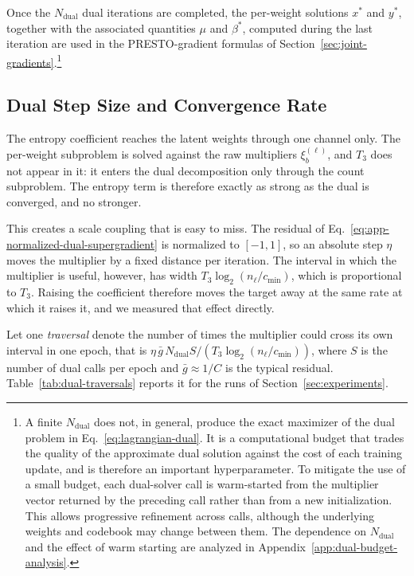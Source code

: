 \documentclass{article}
\begin{document}
Once the $N_{\mathrm{dual}}$ dual iterations are completed, the per-weight
solutions $x^*$ and $y^*$, together with the associated quantities $\mu$ and
$\beta^*$, computed during the last iteration are used in the PRESTO-gradient
formulas of Section~\ref{sec:joint-gradients}.\footnote{A finite
$N_{\mathrm{dual}}$ does not, in general, produce the exact maximizer of the
dual problem in Eq.~\eqref{eq:lagrangian-dual}. It is a computational budget
that trades the quality of the approximate dual solution against the cost of
each training update, and is therefore an important hyperparameter. To mitigate
the use of a small budget, each dual-solver call is warm-started from the
multiplier vector returned by the preceding call rather than from a new
initialization. This allows progressive refinement across calls, although the
underlying weights and codebook may change between them. The dependence on
$N_{\mathrm{dual}}$ and the effect of warm starting are analyzed in
Appendix~\ref{app:dual-budget-analysis}.}


\subsection{Dual Step Size and Convergence Rate}
\label{app:dual-rate}
\label{app:dual-budget-analysis}

The entropy coefficient reaches the latent weights through one channel only.
The per-weight subproblem is solved against the raw multipliers
$\xi_b^{(\ell)}$, and $T_3$ does not appear in it: it enters the dual
decomposition only through the count subproblem. The entropy term is therefore
exactly as strong as the dual is converged, and no stronger.

This creates a scale coupling that is easy to miss. The residual of
Eq.~\eqref{eq:app-normalized-dual-supergradient} is normalized to $[-1,1]$, so an
absolute step $\eta$ moves the multiplier by a fixed distance per iteration.
The interval in which the multiplier is useful, however, has width
$T_3\log_2(n_\ell/c_{\min})$, which is proportional to $T_3$. Raising the
coefficient therefore moves the target away at the same rate at which it raises
it, and we measured that effect directly.

Let one \emph{traversal} denote the number of times the
multiplier could cross its own interval in one epoch, that is
$\eta\,\bar g\,N_{\mathrm{dual}}S/(T_3\log_2(n_\ell/c_{\min}))$, where $S$ is
the number of dual calls per epoch and $\bar g\approx1/C$ is the typical
residual. Table~\ref{tab:dual-traversals} reports it for the runs of
Section~\ref{sec:experiments}.
\end{document}
